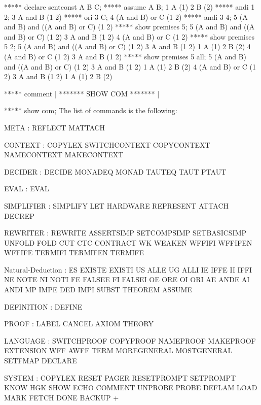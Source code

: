    ***** declare sentconst A B C;
   ***** assume A B;
   1   A     (1)
   2   B     (2)
   ***** andi 1 2;
   3   A and B     (1 2)
   ***** ori 3 C;
   4   (A and B) or C     (1 2)
   ***** andi 3 4;
   5   (A and B) and ((A and B) or C)     (1 2)
   ***** show premises 5;
   5  (A and B) and ((A and B) or C)  (1 2)
      3  A and B  (1 2)
      4  (A and B) or C  (1 2)
   ***** show premises 5 2;
   5  (A and B) and ((A and B) or C)  (1 2)
      3  A and B  (1 2)
         1  A  (1)
         2  B  (2)
      4  (A and B) or C  (1 2)
         3  A and B  (1 2)
   *****  show premises 5 all;
   5  (A and B) and ((A and B) or C)  (1 2)
      3  A and B  (1 2)
         1  A  (1)
         2  B  (2)
      4  (A and B) or C  (1 2)
         3  A and B  (1 2)
            1  A  (1)
            2  B  (2)
   
   
   ***** comment | ******* SHOW COM ******* |
   
   ***** show com;
   The list of commands is the following:

   META : REFLECT MATTACH 

   CONTEXT : COPYLEX SWITCHCONTEXT COPYCONTEXT NAMECONTEXT MAKECONTEXT 

   DECIDER : DECIDE MONADEQ MONAD TAUTEQ TAUT PTAUT 

   EVAL : EVAL 

   SIMPLIFIER : SIMPLIFY LET HARDWARE REPRESENT ATTACH DECREP 

   REWRITER : REWRITE ASSERTSIMP SETCOMPSIMP SETBASICSIMP UNFOLD FOLD CUT
   CTC CONTRACT WK WEAKEN WFFIFI WFFIFEN WFFIFE TERMIFI TERMIFEN TERMIFE  

   Natural-Deduction : ES EXISTE EXISTI US ALLE UG ALLI IE IFFE II IFFI
   NE NOTE NI NOTI FE FALSEE FI FALSEI OE ORE OI ORI AE ANDE AI ANDI MP
   IMPE DED IMPI SUBST THEOREM ASSUME   

   DEFINITION : DEFINE 

   PROOF : LABEL CANCEL AXIOM THEORY 

   LANGUAGE : SWITCHPROOF COPYPROOF NAMEPROOF MAKEPROOF EXTENSION WFF
   AWFF TERM MOREGENERAL MOSTGENERAL SETFMAP DECLARE  

   SYSTEM : COPYLEX RESET PAGER RESETPROMPT SETPROMPT KNOW HGK SHOW ECHO
   COMMENT UNPROBE PROBE DEFLAM LOAD MARK FETCH DONE BACKUP  
+